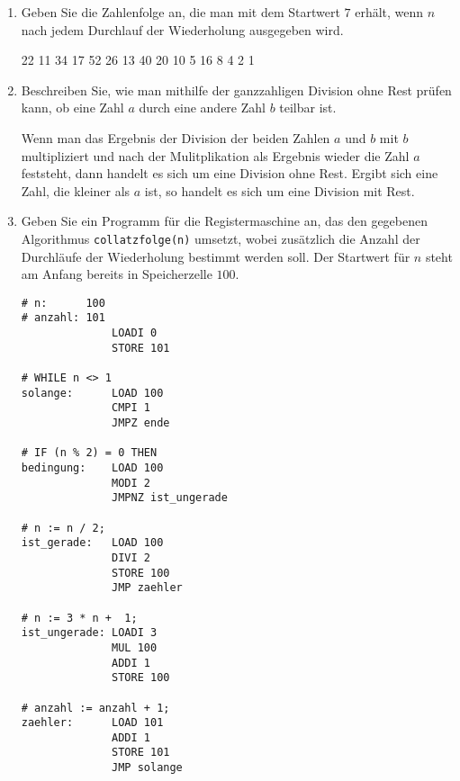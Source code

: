 \documentclass{lehramt-informatik-aufgabe}
\begin{document}
\begin{enumerate}


\item Geben Sie die Zahlenfolge an, die man mit dem Startwert $7$
erhält, wenn $n$ nach jedem Durchlauf der Wiederholung ausgegeben wird.

\begin{liAntwort}
22
11
34
17
52
26
13
40
20
10
5
16
8
4
2
1
\end{liAntwort}


\item Beschreiben Sie, wie man mithilfe der ganzzahligen Division ohne
Rest prüfen kann, ob eine Zahl $a$ durch eine andere Zahl $b$ teilbar
ist.

\begin{liAntwort}
Wenn man das Ergebnis der Division der beiden Zahlen $a$ und $b$ mit $b$
multipliziert und nach der Mulitplikation als Ergebnis wieder die Zahl
$a$ feststeht, dann handelt es sich um eine Division ohne Rest. Ergibt
sich eine Zahl, die kleiner als $a$ ist, so handelt es sich um eine
Division mit Rest.
\end{liAntwort}


\item Geben Sie ein Programm für die Registermaschine an, das den
gegebenen Algorithmus \texttt{collatzfolge(n)} umsetzt, wobei zusätzlich
die Anzahl der Durchläufe der Wiederholung bestimmt werden soll. Der
Startwert für $n$ steht am Anfang bereits in Speicherzelle $100$.


\begin{verbatim}
# n:      100
# anzahl: 101
              LOADI 0
              STORE 101

# WHILE n <> 1
solange:      LOAD 100
              CMPI 1
              JMPZ ende

# IF (n % 2) = 0 THEN
bedingung:    LOAD 100
              MODI 2
              JMPNZ ist_ungerade

# n := n / 2;
ist_gerade:   LOAD 100
              DIVI 2
              STORE 100
              JMP zaehler

# n := 3 * n +  1;
ist_ungerade: LOADI 3
              MUL 100
              ADDI 1
              STORE 100

# anzahl := anzahl + 1;
zaehler:      LOAD 101
              ADDI 1
              STORE 101
              JMP solange


\end{verbatim}
\end{enumerate}
\end{document}

